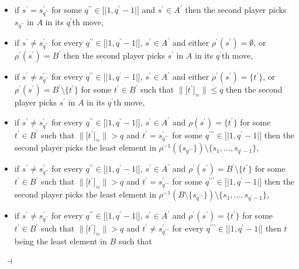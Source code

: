 \documentclass[draft]{article}
\newenvironment{proof}{{\bf Proof:}}{~$\dashv$\\}
\def\lsem{{\lbrack\mid}}
\def\rsem{{\mid\rbrack}}
\begin{document}
\begin{proof}
\begin{itemize}
%
%
in its $q^{\prime}$th move,
%
%
\item if $s^{\prime}{=}s^{\prime}_{q^{\prime\prime}}$ for some $q^{\prime\prime}{\in}\lsem1,q^{\prime}{-}1\rsem$ and $s^{\prime}{\in}A^{\prime}$ then the second player picks $s_{q^{\prime\prime}}$ in $A$ in its $q^{\prime}$th move,
%
%
\item if $s^{\prime}{\not=}s^{\prime}_{q^{\prime\prime}}$ for every $q^{\prime\prime}{\in}\lsem1,q^{\prime}{-}1\rsem$, $s^{\prime}{\in}A^{\prime}$ and either $\rho^{\prime}(s^{\prime}){=}\emptyset$, or $\rho^{\prime}(s^{\prime}){=}B^{\prime}$ then the second player picks $s^{\prime}$ in $A$ in its $q^{\prime}$th move,
%
%
\item if $s^{\prime}{\not=}s^{\prime}_{q^{\prime\prime}}$ for every $q^{\prime\prime}{\in}\lsem1,q^{\prime}{-}1\rsem$, $s^{\prime}{\in}A^{\prime}$ and either $\rho^{\prime}(s^{\prime}){=}\{t^{\prime}\}$, or $\rho^{\prime}(s^{\prime}){=}B^{\prime}
%
%
%
%
%
%
%
%
%
%
%
%
$\linebreak$
%
%
%
%
%
%
%
%
%
%
%
%
{\setminus}\{t^{\prime}\}$ for some $t^{\prime}{\in}B^{\prime}$ such that ${\parallel}\lbrack t^{\prime}\rbrack_{\approx}{\parallel}{\leq}q$ then the second player picks $s^{\prime}$ in $A$ in its $q^{\prime}$th move,
%
%
\item if $s^{\prime}{\not=}s^{\prime}_{q^{\prime\prime}}$ for every $q^{\prime\prime}{\in}\lsem1,q^{\prime}{-}1\rsem$, $s^{\prime}{\in}A^{\prime}$ and $\rho(s^{\prime}){=}\{t^{\prime}\}$ for some $t^{\prime}{\in}B^{\prime}$ such that ${\parallel}\lbrack t^{\prime}\rbrack_{\approx}{\parallel}{>}q$ and $t^{\prime}{=}s^{\prime}_{q^{\prime\prime\prime}}$ for some $q^{\prime\prime\prime}{\in}\lsem1,q^{\prime}{-}1\rsem$ then the second player picks the least element in ${\rho}^{{-}1}(\{s_{q^{\prime\prime\prime}}\}){\setminus}\{s_{1},\ldots,s_{q^{\prime}{-}1}\}$,
%
%
\item if $s^{\prime}{\not=}s^{\prime}_{q^{\prime\prime}}$ for every $q^{\prime\prime}{\in}\lsem1,q^{\prime}{-}1\rsem$, $s^{\prime}{\in}A^{\prime}$ and $\rho^{\prime}(s^{\prime}){=}B^{\prime}{\setminus}\{t^{\prime}\}$ for some $t^{\prime}{\in}B^{\prime}$ such that ${\parallel}\lbrack t^{\prime}\rbrack_{\approx}{\parallel}{>}q$ and $t^{\prime}{=}s^{\prime}_{q^{\prime\prime\prime}}$ for some $q^{\prime\prime\prime}{\in}\lsem1,q^{\prime}{-}1\rsem$ then the second player picks the least element in ${\rho}^{{-}1}(B{\setminus}\{s_{q^{\prime\prime\prime}}\}){\setminus}\{s_{1},\ldots,s_{q^{\prime}{-}1}\}$,
%
%
\item if $s^{\prime}{\not=}s^{\prime}_{q^{\prime\prime}}$ for every $q^{\prime\prime}{\in}\lsem1,q^{\prime}{-}1\rsem$, $s^{\prime}{\in}A^{\prime}$ and $\rho^{\prime}(s^{\prime}){=}\{t^{\prime}\}$ for some $t^{\prime}{\in}B^{\prime}$ such that ${\parallel}\lbrack t^{\prime}\rbrack_{\approx}{\parallel}{>}q$ and $t^{\prime}{\not=}s^{\prime}_{q^{\prime\prime\prime}}$ for every $q^{\prime\prime\prime}{\in}\lsem1,q^{\prime}{-}1\rsem$ then $t$ being the least element in $B$ such that

\end{itemize}
\end{proof}
\end{document}
